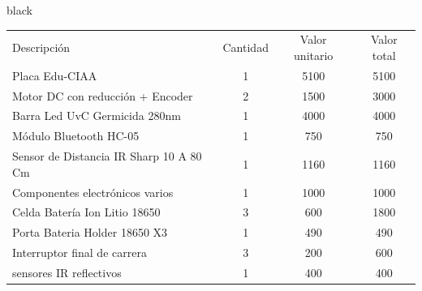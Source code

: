 \documentclass[11pt]{charter}
\begin{document}
\begin{consigna}{black}

\vspace{-12mm}
\begin{table}[htpb]
\centering
\begin{tabularx}{\linewidth}{@{}|X|c|r|r|@{}}
\hline
\rowcolor[HTML]{C0C0C0} 
\multicolumn{4}{|c|}{\cellcolor[HTML]{C0C0C0}COSTOS DIRECTOS} \\ \hline
\rowcolor[HTML]{C0C0C0} 
Descripción &
  \multicolumn{1}{c|}{\cellcolor[HTML]{C0C0C0}Cantidad} &
  \multicolumn{1}{c|}{\cellcolor[HTML]{C0C0C0}Valor unitario} &
  \multicolumn{1}{c|}{\cellcolor[HTML]{C0C0C0}Valor total} \\ \hline
\multicolumn{1}{|l|}{ Placa Edu-CIAA} &
  \multicolumn{1}{c|}{1} &
  \multicolumn{1}{c|}{5100} &
  \multicolumn{1}{c|}{5100} \\ \hline
\multicolumn{1}{|l|}{Motor DC con reducción + Encoder} &
  \multicolumn{1}{c|}{2} &
  \multicolumn{1}{c|}{1500} &
  \multicolumn{1}{c|}{3000} \\ \hline
\multicolumn{1}{|l|}{Barra Led UvC Germicida 280nm} &
  \multicolumn{1}{c|}{1} &
  \multicolumn{1}{c|}{4000} &
  \multicolumn{1}{c|}{4000} \\ \hline
\multicolumn{1}{|l|}{Módulo Bluetooth HC-05} &
  \multicolumn{1}{c|}{1} &
  \multicolumn{1}{c|}{750} &
  \multicolumn{1}{c|}{750} \\ \hline
\multicolumn{1}{|l|}{Sensor de Distancia IR Sharp 10 A 80 Cm} &
  \multicolumn{1}{c|}{1} &
  \multicolumn{1}{c|}{1160} &
  \multicolumn{1}{c|}{1160} \\ \hline
\multicolumn{1}{|l|}{Componentes electrónicos varios} &
  \multicolumn{1}{c|}{1} &
  \multicolumn{1}{c|}{1000} &
  \multicolumn{1}{c|}{1000} \\ \hline
\multicolumn{1}{|l|}{Celda Batería Ion Litio 18650} &
  \multicolumn{1}{c|}{3} &
  \multicolumn{1}{c|}{600} &
  \multicolumn{1}{c|}{1800} \\ \hline
\multicolumn{1}{|l|}{Porta Bateria Holder 18650 X3} &
  \multicolumn{1}{c|}{1} &
  \multicolumn{1}{c|}{490} &
  \multicolumn{1}{c|}{490} \\ \hline
\multicolumn{1}{|l|}{Interruptor final de carrera} &
  \multicolumn{1}{c|}{3} &
  \multicolumn{1}{c|}{200} &
  \multicolumn{1}{c|}{600} \\ \hline
\multicolumn{1}{|l|}{sensores IR reflectivos } &
  \multicolumn{1}{c|}{1} &
  \multicolumn{1}{c|}{400} &
  \multicolumn{1}{c|}{400} \\ \hline

\end{tabularx}
\end{table}
\end{consigna}
\end{document}
